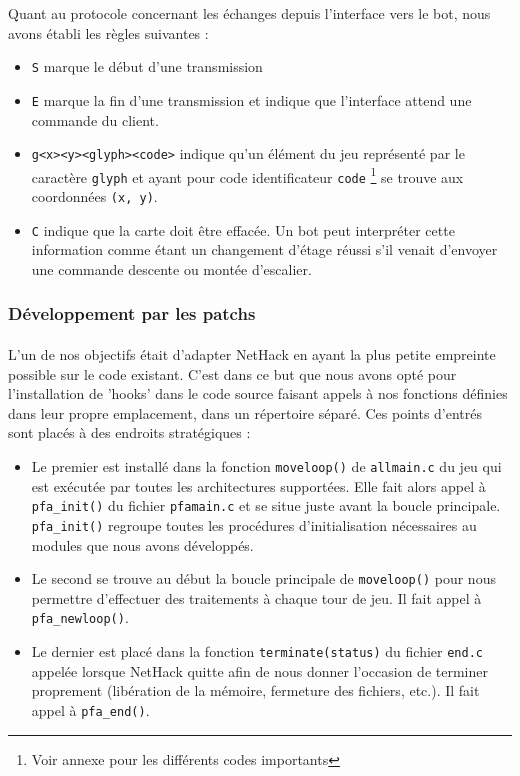 \documentclass[a4paper,12pt]{article}
\begin{document}
Quant au protocole concernant les échanges depuis l'interface vers le bot, nous avons établi les règles suivantes :
\begin{itemize}
	\item \verb!S! marque le début d'une transmission
	\item \verb!E! marque la fin d'une transmission et indique que l'interface attend une commande du client.
	\item \verb!g<x><y><glyph><code>! indique qu'un élément du jeu représenté par le caractère \verb!glyph! et ayant pour code identificateur \verb!code! \footnote{Voir annexe pour les différents codes importants} se trouve aux coordonnées \verb!(x, y)!.
	\item \verb!C! indique que la carte doit être effacée. Un bot peut interpréter cette information comme étant un changement d'étage réussi s'il venait d'envoyer une commande descente ou montée d'escalier.
\end{itemize}


\subsubsection*{Développement par les patchs}

\paragraph{} L'un de nos objectifs était d'adapter NetHack en ayant la plus petite empreinte possible sur le code existant. C'est dans ce but que nous avons opté pour l'installation de 'hooks' dans le code source faisant appels à nos fonctions définies dans leur propre emplacement, dans un répertoire séparé. Ces points d'entrés sont placés à des endroits stratégiques :
\begin{itemize}
	\item Le premier est installé dans la fonction \verb!moveloop()! de \verb!allmain.c! du jeu qui est exécutée par toutes les architectures supportées. Elle fait alors appel à \verb!pfa_init()! du fichier \verb!pfamain.c! et se situe juste avant la boucle principale. \verb!pfa_init()! regroupe toutes les procédures d'initialisation nécessaires au modules que nous avons développés.
	\item Le second se trouve au début la boucle principale de \verb!moveloop()! pour nous permettre d'effectuer des traitements à chaque tour de jeu. Il fait appel à \verb!pfa_newloop()!.
	\item Le dernier est placé dans la fonction \verb!terminate(status)! du fichier \verb!end.c! appelée lorsque NetHack quitte afin de nous donner l'occasion de terminer proprement (libération de la mémoire, fermeture des fichiers, etc.). Il fait appel à \verb!pfa_end()!.
\end{itemize}
\end{document}
